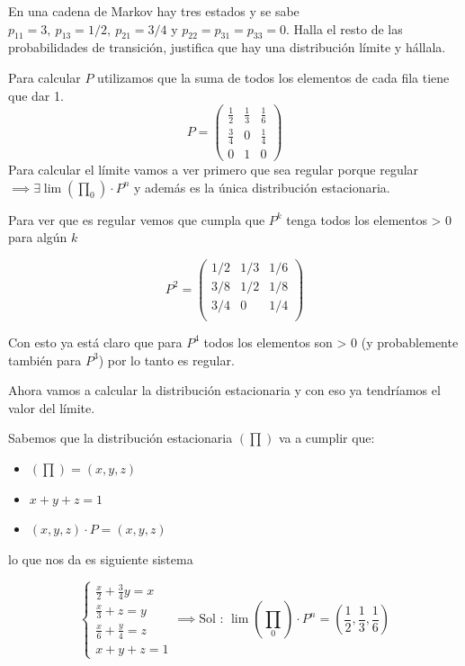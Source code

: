 \begin{problem}[5]
	En una cadena de Markov hay tres estados y se sabe $p_{11} = 3,\ p_{13} = 1/2, \ p_{21} = 3/4$  y $
	p_{22} = p_{31} = p_{33} = 0$. Halla el resto de las probabilidades de transición, justifica que hay una distribución límite y hállala.
	\solution

	Para calcular $P$ utilizamos que la suma de todos los elementos de cada fila tiene que dar 1.
	$$P = \left( \begin{matrix}
	\frac{1}{2}&\boxed{\frac{1}{3}}&\frac{1}{6}\\
	\frac{3}{4}&0&\boxed{\frac{1}{4}}\\
	0&\boxed{1}&0
	\end{matrix}\right)$$
	Para calcular el límite vamos a ver primero que sea regular porque regular $\implies \exists \lim (\prod_0)\cdot P^n$ y además es la única distribución estacionaria.

	Para ver que es regular vemos que cumpla que $P^k$ tenga todos los elementos > 0 para algún $k$

	$$P^2 = \left( \begin{matrix}
	1/2&1/3&1/6\\
	3/8&1/2&1/8\\
	3/4&0&1/4\\
	\end{matrix}\right)$$

	Con esto ya está claro que para $P^4$ todos los elementos son > 0 (y probablemente también para $P^3$) por lo tanto es regular.

	Ahora vamos a calcular la distribución estacionaria y con eso ya tendríamos el valor del límite.

	\newpage
	Sabemos que la distribución estacionaria $(\prod)$ va a cumplir que:
	\begin{itemize}
		\item $(\prod) = (x,y,z)$
		\item $x+y+z = 1$
		\item $(x,y,z) \cdot P = (x,y,z)$
	\end{itemize}
	lo que nos da es siguiente sistema

	$$\begin{cases}
	\frac{x}{2} + \frac{3}{4}y = x\\
	\frac{x}{3} + z = y\\
	\frac{x}{6} + \frac{y}{4} = z\\
	x + y + z = 1
	\end{cases} \implies \text{Sol : } \lim\left(\prod_0\right) \cdot P^n = \left(\frac{1}{2}, \frac{1}{3}, \frac{1}{6}\right)$$


\end{problem}

